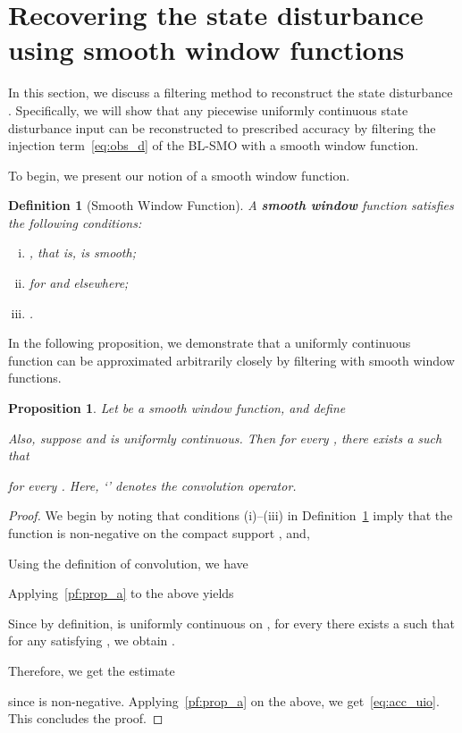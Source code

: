 \documentclass[times, doublespace]{rncauth}
\newtheorem{prop}{Proposition}
\newtheorem{definition}{Definition}
\begin{document}
\section{Recovering the state disturbance using smooth window functions}
\label{sec:lpf}
In this section, we discuss a filtering method to reconstruct the state disturbance . Specifically, we will show that any piecewise uniformly continuous state disturbance input can be reconstructed to prescribed accuracy by filtering the injection term~\eqref{eq:obs_d} of the BL-SMO with a smooth window function.
 
To begin, we present our notion of a smooth window function.
\begin{definition}[Smooth Window Function]
\label{def:swf}
	A \textbf{smooth window} function  satisfies the following conditions:
	\begin{enumerate}[(i)]
		\item , that is,  is smooth;
		\item  for  and  elsewhere;
		\item .
	\end{enumerate}
\end{definition}
In the following proposition, we demonstrate that a uniformly continuous function can be approximated arbitrarily closely by filtering with smooth window functions.
\begin{prop}
	\label{lem:trig_poly}
	Let  be a smooth window function, and define
	
	Also, suppose  and  is uniformly continuous. Then for every , there exists a  such that
	
	for every . Here, `' denotes the convolution operator.
\end{prop}
\begin{proof}
	We begin by noting that conditions (i)--(iii) in Definition~\ref{def:swf} imply that the function  is non-negative on the compact support , and,
	
	Using the definition of convolution, we have
	
	Applying~\eqref{pf:prop_a} to the above yields
	
	Since by definition,  is uniformly continuous on , for every  there exists a  such that for any  satisfying , we obtain .
	
	Therefore, we get the estimate
	
	since  is non-negative. Applying~\eqref{pf:prop_a} on the above, we get~\eqref{eq:acc_uio}. This concludes the proof.
\end{proof}
\end{document}
